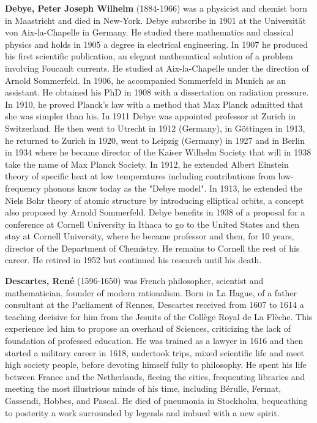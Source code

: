 \textbf{Debye, Peter Joseph Wilhelm} (1884-1966) was a  physicist and chemist born in Maastricht and died in New-York. Debye subscribe in 1901 at the Universität von Aix-la-Chapelle in Germany. He studied there mathematics and classical physics and holds in 1905 a degree in electrical engineering. In 1907 he produced his first scientific publication, an elegant mathematical solution of a problem involving Foucault currents. He studied at Aix-la-Chapelle under the direction of Arnold Sommerfeld. In 1906, he accompanied Sommerfeld in Munich as an assistant. He obtained his PhD in 1908 with a dissertation on radiation pressure. In 1910, he proved Planck's law with a method that Max Planck admitted that she was simpler than his. In 1911 Debye was appointed professor at Zurich in Switzerland. He then went to Utrecht in 1912 (Germany), in Göttingen in 1913, he returned to Zurich in 1920, went to Leipzig (Germany) in 1927 and in Berlin in 1934 where he became director of the Kaiser Wilhelm Society that will in 1938 take the name of Max Planck Society. In 1912, he extended Albert Einstein theory of specific heat at low temperatures including contributions from low-frequency phonons know today as the "Debye model". In 1913, he extended the Niels Bohr theory of atomic structure by introducing elliptical orbits, a concept also proposed by Arnold Sommerfeld. Debye benefits in 1938 of a proposal for a conference at Cornell University in Ithaca to go to the United States and then stay at Cornell University, where he became professor and then, for 10 years, director of the Department of Chemistry. He remains to Cornell the rest of his career. He retired in 1952 but continued his research until his death.

\textbf{Descartes, René} (1596-1650) was French philosopher, scientist and mathematician, founder of modern rationalism. Born in La Hague, of a father consultant at the Parliament of Rennes, Descartes received from 1607 to 1614 a teaching decisive for him from the Jesuits of the Collège Royal de La Flèche. This experience led him to propose an overhaul of Sciences, criticizing the lack of foundation of professed education. He was trained as a lawyer in 1616 and then started a military career in 1618, undertook trips, mixed scientific life and meet high society people, before devoting himself fully to philosophy. He spent his life between France and the Netherlands, fleeing the cities, frequenting libraries and meeting the most illustrious minds of his time, including Bérulle, Fermat, Gassendi, Hobbes, and Pascal. He died of pneumonia in Stockholm, bequeathing to posterity a work surrounded by legends and imbued with a new spirit.

